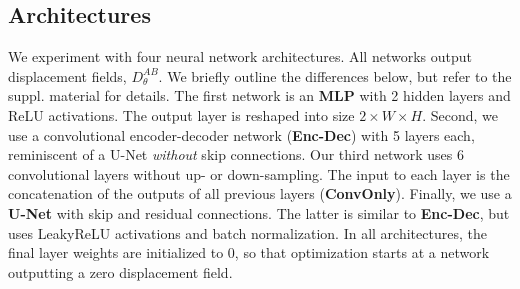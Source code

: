 \documentclass[10pt,twocolumn,letterpaper]{article} %
\begin{document}
\subsection{Architectures}
\label{subsection:architectures}

We experiment with four neural network architectures. All networks output displacement fields, $D_\theta^{AB}$. We briefly outline the differences below, but refer to the suppl. material for details. The first network is an \textbf{MLP} with 2 hidden layers and ReLU activations. The output layer is reshaped into size $2 \times W \times H$. %
Second, we use a convolutional encoder-decoder network (\textbf{Enc-Dec}) with 5 layers each, reminiscent of a U-Net \emph{without} skip connections. 
Our third network uses 6 convolutional layers without up- or down-sampling. The input to each layer is the concatenation of the outputs of all previous layers (\textbf{ConvOnly}). 
Finally, we use a \textbf{U-Net} with skip and residual connections. The latter is similar to \textbf{Enc-Dec}, but uses LeakyReLU activations and batch normalization.
In all architectures, the final layer weights are initialized to 0, so that optimization starts at a network outputting a zero displacement field.
\end{document}
